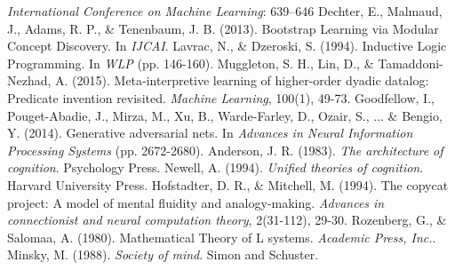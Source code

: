 \documentclass[11pt,letterpaper]{article}
\begin{document}
\begin{thebibliography}{}
    \emph{International Conference on Machine Learning}: 639–646
    Dechter, E., Malmaud, J., Adams, R. P., \& Tenenbaum, J. B. (2013).
    Bootstrap Learning via Modular Concept Discovery.
    In \emph{IJCAI}.
    Lavrac, N., \& Dzeroski, S. (1994).
    Inductive Logic Programming.
    In \emph{WLP} (pp. 146-160).
    Muggleton, S. H., Lin, D., \& Tamaddoni-Nezhad, A. (2015).
    Meta-interpretive learning of higher-order dyadic datalog: Predicate
    invention revisited.
    \emph{Machine Learning}, 100(1), 49-73.
    Goodfellow, I., Pouget-Abadie, J., Mirza, M., Xu, B., Warde-Farley, D.,
    Ozair, S., ... \& Bengio, Y. (2014).
    Generative adversarial nets.
    In \emph{Advances in Neural Information Processing Systems} (pp.
    2672-2680).
    Anderson, J. R. (1983).
    \emph{The architecture of cognition}. Psychology Press.
    Newell, A. (1994).
    \emph{Unified theories of cognition}. Harvard University Press.
    Hofstadter, D. R., \& Mitchell, M. (1994).
    The copycat project: A model of mental fluidity and analogy-making.
    \emph{Advances in connectionist and neural computation theory}, 2(31-112), 29-30.
    Rozenberg, G., \& Salomaa, A. (1980).
    Mathematical Theory of L systems.
    \emph{Academic Press, Inc.}.
    Minsky, M. (1988).
    \emph{Society of mind}.
    Simon and Schuster.
\end{thebibliography}
\end{document}

